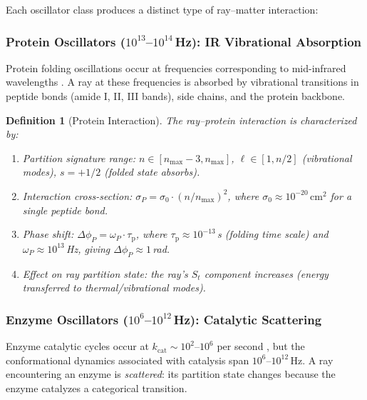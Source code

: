 \documentclass[11pt,twocolumn,a4paper]{article}
\newtheorem{definition}[theorem]{Definition}
\newcommand{\St}{S_t}
\newcommand{\taup}{\tau_{\mathrm{p}}}
\begin{document}
Each oscillator class produces a distinct type of ray--matter
interaction:

\subsubsection{Protein Oscillators ($10^{13}$--$10^{14}$\,Hz):
IR Vibrational Absorption}

Protein folding oscillations occur at frequencies corresponding to
mid-infrared wavelengths \citep{anfinsen1973}. A ray at these
frequencies is absorbed by vibrational transitions in peptide bonds
(amide I, II, III bands), side chains, and the protein backbone.

\begin{definition}[Protein Interaction]
\label{def:protein-interaction}
The ray--protein interaction is characterized by:
\begin{enumerate}[label=(\alph*),leftmargin=*]
\item \textit{Partition signature range:} $n \in [n_{\max}-3,
  n_{\max}]$, $\ell \in [1, n/2]$ (vibrational modes), $s = +1/2$
  (folded state absorbs).
\item \textit{Interaction cross-section:}
  $\sigma_P = \sigma_0 \cdot (n/n_{\max})^2$, where $\sigma_0 \approx
  10^{-20}\,\text{cm}^2$ for a single peptide bond.
\item \textit{Phase shift:} $\Delta\phi_P = \omega_P \cdot \taup$,
  where $\taup \approx 10^{-13}$\,s (folding time scale) and
  $\omega_P \approx 10^{13}$\,Hz, giving $\Delta\phi_P \approx 1$\,rad.
\item \textit{Effect on ray partition state:} the ray's $\St$ component
  increases (energy transferred to thermal/vibrational modes).
\end{enumerate}
\end{definition}

\subsubsection{Enzyme Oscillators ($10^{6}$--$10^{12}$\,Hz):
Catalytic Scattering}

Enzyme catalytic cycles occur at $k_{\mathrm{cat}} \sim 10^2$--$10^6$
per second \citep{fersht1999}, but the conformational dynamics
associated with catalysis span $10^6$--$10^{12}$\,Hz. A ray
encountering an enzyme is \emph{scattered}: its partition state
changes because the enzyme catalyzes a categorical transition.
\end{document}
